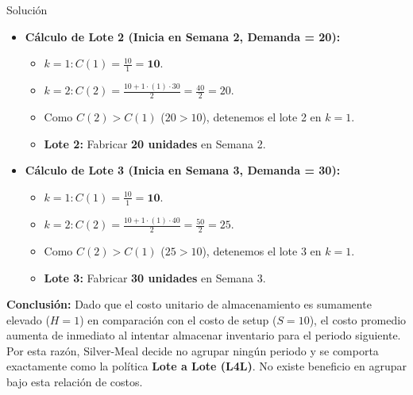 \documentclass[11pt, a4paper]{article}
\begin{document}
\begin{ejercicio}{Solución}
\begin{itemize}
    \item \textbf{Cálculo de Lote 2 (Inicia en Semana 2, Demanda = 20):}
    \begin{itemize}
      \item $k=1: C(1) = \frac{10}{1} = \mathbf{10}$.
      \item $k=2: C(2) = \frac{10 + 1 \cdot (1) \cdot 30}{2} = \frac{40}{2} = 20$.
      \item Como $C(2) > C(1)$ ($20 > 10$), detenemos el lote 2 en $k=1$.
      \item \textbf{Lote 2:} Fabricar \textbf{20 unidades} en Semana 2.
    \end{itemize}

    \item \textbf{Cálculo de Lote 3 (Inicia en Semana 3, Demanda = 30):}
    \begin{itemize}
      \item $k=1: C(1) = \frac{10}{1} = \mathbf{10}$.
      \item $k=2: C(2) = \frac{10 + 1 \cdot (1) \cdot 40}{2} = \frac{50}{2} = 25$.
      \item Como $C(2) > C(1)$ ($25 > 10$), detenemos el lote 3 en $k=1$.
      \item \textbf{Lote 3:} Fabricar \textbf{30 unidades} en Semana 3.
    \end{itemize}
  \end{itemize}

  \textbf{Conclusión:}
  Dado que el costo unitario de almacenamiento es sumamente elevado ($H=1$) en comparación con el costo de setup ($S=10$), el costo promedio aumenta de inmediato al intentar almacenar inventario para el periodo siguiente. Por esta razón, Silver-Meal decide no agrupar ningún periodo y se comporta exactamente como la política \textbf{Lote a Lote (L4L)}. No existe beneficio en agrupar bajo esta relación de costos.

\end{ejercicio}

\newpage


\newpage
\end{document}
